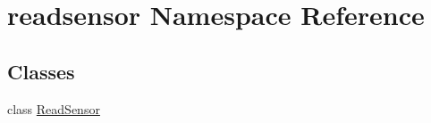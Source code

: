 \hypertarget{namespacereadsensor}{}\section{readsensor Namespace Reference}
\label{namespacereadsensor}
\subsection*{Classes}
\begin{DoxyCompactItemize}
\item 
class \hyperlink{classreadsensor_1_1ReadSensor}{Read\+Sensor}
\end{DoxyCompactItemize}
